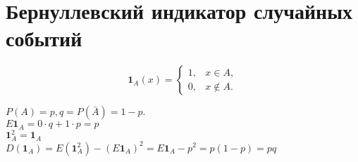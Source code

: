 \section{Бернуллевский индикатор случайных событий}

$$\mathbf{1}_A(x) = \left\{\begin{matrix}
  1, &x \in A, \\
  0, &x \notin A.
\end{matrix}\right.$$

  $P(A) = p, q = P(\bar{A}) = 1-p.$\\
  $E\mathbf{1}_A = 0\cdot q+1\cdot p = p$\\
  $\mathbf{1}_A^2 = \mathbf{1}_A$\\
  $D(\mathbf{1}_A)=E(\mathbf{1}_A^2)-(E\mathbf{1}_A)^2 = E\mathbf{1}_A-p^2 = p(1-p) = pq$
